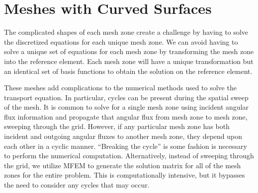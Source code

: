 \documentclass[12pt]{article}
\begin{document}
\section{Meshes with Curved Surfaces}
\label{sec:HOMeshes}
The complicated shapes of each mesh zone create a challenge by having to solve the discretized equations for each unique mesh zone. We can avoid having to solve a unique set of equations for each mesh zone by transforming the mesh zone into the reference element. Each mesh zone will have a unique transformation but an identical set of basis functions to obtain the solution on the reference element.

{\color{red}
These meshes add complications to the numerical methods used to solve the transport equation. In particular, cycles can be present during the spatial sweep of the mesh. It is common to solve for a single mesh zone using incident angular flux information and propagate that angular flux from mesh zone to mesh zone, sweeping through the grid. However, if any particular mesh zone has both incident and outgoing angular fluxes to another mesh zone, they depend upon each other in a cyclic manner. ``Breaking the cycle'' is some fashion is necessary to perform the numerical computation. Alternatively, instead of sweeping through the grid, we utilize MFEM to generate the solution matrix for all of the mesh zones for the entire problem. This is computationally intensive, but it bypasses the need to consider any cycles that may occur.
}

\end{document}
